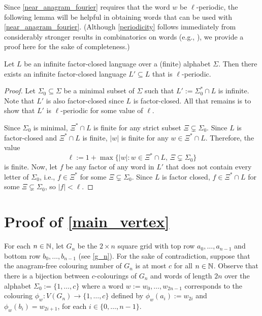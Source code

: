 \documentclass{patmorin}
\begin{document}
Since \cref{near_anagram_fourier} requires that the word $w$ be $\ell$-periodic, the following lemma will be helpful in obtaining words that can be used with \cref{near_anagram_fourier}. (Although \cref{periodicity} follows immediately from considerably stronger results in combinatorics on words (e.g., \citet[Proposition~1.5.12]{lothaire:combinatorics}), we provide a proof here for the sake of completeness.)


\begin{lem}\label{periodicity}
    Let $L$ be an infinite factor-closed language over a (finite) alphabet $\Sigma$.  Then there exists an infinite factor-closed language $L'\subseteq L$ that is $\ell$-periodic.
\end{lem}


\begin{proof}
    Let $\Sigma_0\subseteq\Sigma$ be a minimal subset of $\Sigma$ such that $L':=\Sigma_0^* \cap L$ is infinite.  Note that $L'$ is also factor-closed since $L$ is factor-closed.  All that remains is to show that $L'$ is $\ell$-periodic for some value of $\ell$.

    Since $\Sigma_0$ is minimal, $\Xi^*\cap L$ is finite for any strict subset $\Xi\subsetneq \Sigma_0$.  Since $L$ is factor-closed and $\Xi^*\cap L$ is finite, $|w|$ is finite for any $w\in\Xi^*\cap L$.
    Therefore, the value
    \[
        \ell:=1+\max\{|w|: w\in \Xi^*\cap L,\, \Xi\subsetneq\Sigma_0\}
    \]
    is finite.  Now, let $f$ be any factor of any word in $L'$ that does not contain every letter of $\Sigma_0$, i.e., $f\in\Xi^*$ for some  $\Xi\subsetneq\Sigma_0$.  Since $L$ is factor closed, $f\in \Xi^*\cap L$ for some $\Xi\subsetneq\Sigma_0$, so $|f|<\ell$.
\end{proof}


\section{Proof of \cref{main_vertex}}
\label{vertex_colourings}

For each $n\in\mathbb{N}$, let $G_n$ be the $2\times n$ square grid with top row $a_0,\ldots,a_{n-1}$ and bottom row $b_0,\ldots,b_{n-1}$ (see \cref{g_n}).  For the sake of contradiction, suppose that the anagram-free colouring number of $G_n$ is at most $c$ for all $n\in\mathbb{N}$.  Observe that there is a bijection between $c$-colourings of $G_n$ and words of length $2n$ over the alphabet $\Sigma_0:=\{1,\ldots,c\}$ where a word $w:=w_0,\ldots,w_{2n-1}$ corresponds to the colouring $\phi_w:V(G_n)\to\{1,\ldots,c\}$ defined by
$\phi_w(a_i):=w_{2i}$ and $\phi_w(b_i)=w_{2i+1}$, for each $i\in\{0,\ldots,n-1\}$.
\end{document}
